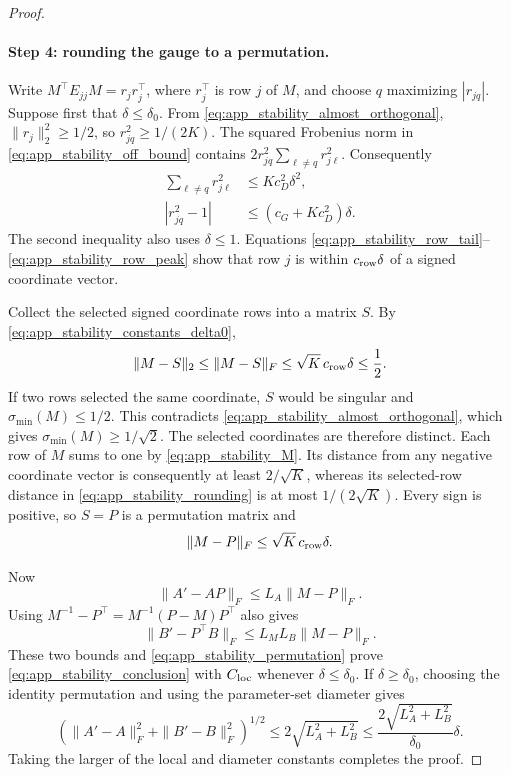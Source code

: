 \begin{proof}
\paragraph{Step 4: rounding the gauge to a permutation.}
Write \(M^\top E_{jj}M=r_jr_j^\top\), where \(r_j^\top\) is row \(j\) of
\(M\), and choose \(q\) maximizing \(|r_{jq}|\).  Suppose first that
\(\delta\le\delta_0\).  From
\eqref{eq:app_stability_almost_orthogonal},
\(\|r_j\|_2^2\ge1/2\), so \(r_{jq}^2\ge1/(2K)\).  The squared Frobenius norm
in \eqref{eq:app_stability_off_bound} contains
\(2r_{jq}^2\sum_{\ell\ne q}r_{j\ell}^2\).  Consequently
\begin{align}
 \sum_{\ell\ne q}r_{j\ell}^2
 &\le Kc_D^2\delta^2,
 \label{eq:app_stability_row_tail}\\
 |r_{jq}^2-1|
 &\le(c_G+Kc_D^2)\delta.
 \label{eq:app_stability_row_peak}
\end{align}
The second inequality also uses \(\delta\le1\).  Equations
\eqref{eq:app_stability_row_tail}--\eqref{eq:app_stability_row_peak} show that
row \(j\) is within \(c_{\rm row}\delta\) of a signed coordinate vector.

Collect the selected signed coordinate rows into a matrix \(S\).  By
\eqref{eq:app_stability_constants_delta0},
\begin{equation}
 \|M-S\|_2\le\|M-S\|_F
 \le\sqrt K\,c_{\rm row}\delta\le\frac12.
 \label{eq:app_stability_rounding}
\end{equation}
If two rows selected the same coordinate, \(S\) would be singular and
\(\sigma_{\min}(M)\le1/2\).  This contradicts
\eqref{eq:app_stability_almost_orthogonal}, which gives
\(\sigma_{\min}(M)\ge1/\sqrt2\).  The selected coordinates are therefore
distinct.  Each row of \(M\) sums to one by \eqref{eq:app_stability_M}.  Its
distance from any negative coordinate vector is consequently at least
\(2/\sqrt K\), whereas its selected-row distance in
\eqref{eq:app_stability_rounding} is at most \(1/(2\sqrt K)\).  Every sign is
positive, so \(S=P\) is a permutation matrix and
\begin{equation}
 \|M-P\|_F\le\sqrt K\,c_{\rm row}\delta.
 \label{eq:app_stability_permutation}
\end{equation}

Now
\[
 \|A'-AP\|_F\le L_A\|M-P\|_F.
\]
Using
\(M^{-1}-P^\top=M^{-1}(P-M)P^\top\) also gives
\[
 \|B'-P^\top B\|_F
 \le L_ML_B\|M-P\|_F.
\]
These two bounds and \eqref{eq:app_stability_permutation} prove
\eqref{eq:app_stability_conclusion} with \(C_{\rm loc}\) whenever
\(\delta\le\delta_0\).  If \(\delta\ge\delta_0\), choosing the identity
permutation and using the parameter-set diameter gives
\[
 \left(\|A'-A\|_F^2+\|B'-B\|_F^2\right)^{1/2}
 \le2\sqrt{L_A^2+L_B^2}
 \le\frac{2\sqrt{L_A^2+L_B^2}}{\delta_0}\delta.
\]
Taking the larger of the local and diameter constants completes the proof.
\end{proof}

